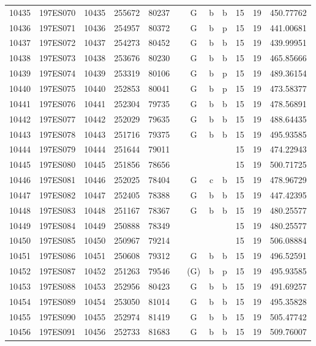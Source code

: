 \begin{tabular}{|*{12}{c|}}
10435 & 197ES070 & 10435 & 255672 & 80237 &  & G & b & b & 15 & 19 & 450.77762 \\ 
10436 & 197ES071 & 10436 & 254957 & 80372 &  & G & b & p & 15 & 19 & 441.00681 \\ 
10437 & 197ES072 & 10437 & 254273 & 80452 &  & G & b & b & 15 & 19 & 439.99951 \\ 
10438 & 197ES073 & 10438 & 253676 & 80230 &  & G & b & b & 15 & 19 & 465.85666 \\ 
10439 & 197ES074 & 10439 & 253319 & 80106 &  & G & b & p & 15 & 19 & 489.36154 \\ 
10440 & 197ES075 & 10440 & 252853 & 80041 &  & G & b & p & 15 & 19 & 473.58377 \\ 
10441 & 197ES076 & 10441 & 252304 & 79735 &  & G & b & b & 15 & 19 & 478.56891 \\ 
10442 & 197ES077 & 10442 & 252029 & 79635 &  & G & b & b & 15 & 19 & 488.64435 \\ 
10443 & 197ES078 & 10443 & 251716 & 79375 &  & G & b & b & 15 & 19 & 495.93585 \\ 
10444 & 197ES079 & 10444 & 251644 & 79011 &  &  &  &  & 15 & 19 & 474.22943 \\ 
10445 & 197ES080 & 10445 & 251856 & 78656 &  &  &  &  & 15 & 19 & 500.71725 \\ 
10446 & 197ES081 & 10446 & 252025 & 78404 &  & G & c & b & 15 & 19 & 478.96729 \\ 
10447 & 197ES082 & 10447 & 252405 & 78388 &  & G & b & b & 15 & 19 & 447.42395 \\ 
10448 & 197ES083 & 10448 & 251167 & 78367 &  & G & b & b & 15 & 19 & 480.25577 \\ 
10449 & 197ES084 & 10449 & 250888 & 78349 &  &  &  &  & 15 & 19 & 480.25577 \\ 
10450 & 197ES085 & 10450 & 250967 & 79214 &  &  &  &  & 15 & 19 & 506.08884 \\ 
10451 & 197ES086 & 10451 & 250608 & 79312 &  & G & b & b & 15 & 19 & 496.52591 \\ 
10452 & 197ES087 & 10452 & 251263 & 79546 &  & (G) & b & p & 15 & 19 & 495.93585 \\ 
10453 & 197ES088 & 10453 & 252956 & 80423 &  & G & b & b & 15 & 19 & 491.69257 \\ 
10454 & 197ES089 & 10454 & 253050 & 81014 &  & G & b & b & 15 & 19 & 495.35828 \\ 
10455 & 197ES090 & 10455 & 252974 & 81419 &  & G & b & b & 15 & 19 & 505.47742 \\ 
10456 & 197ES091 & 10456 & 252733 & 81683 &  & G & b & b & 15 & 19 & 509.76007 \\ 

\end{tabular}
